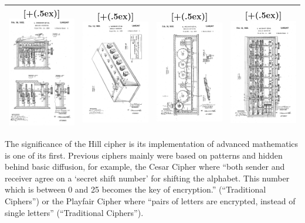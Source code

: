 \documentclass{article}
\newcommand*{\addheight}[2][.5ex]{%
  \raisebox{0pt}[\dimexpr\height+(#1)\relax]{#2}%
}
\begin{document}
\noindent
\begin{center}

\begin{tabular}{|c|c|c|c|}
      \hline
      \addheight{\includegraphics[width=30mm]{patent_1.png}} &
      \addheight{\includegraphics[width=30mm]{patent_2.png}} &
      \addheight{\includegraphics[width=30mm]{patent_3.png}} &
      \addheight{\includegraphics[width=30mm]{patent_4.png}}\\
      \hline
\end{tabular}   

\end{center}

\noindent
The significance of the Hill cipher is its implementation of advanced mathematics is one of its first. Previous ciphers mainly were based on patterns and hidden behind basic diffusion, for example, the Cesar Cipher where “both sender and receiver agree on a ‘secret shift number’ for shifting the alphabet. This number which is between 0 and 25 becomes the key of encryption.” (“Traditional Ciphers”) or the Playfair Cipher where “pairs of letters are encrypted, instead of single letters” (“Traditional Ciphers”).
\\
\end{document}
